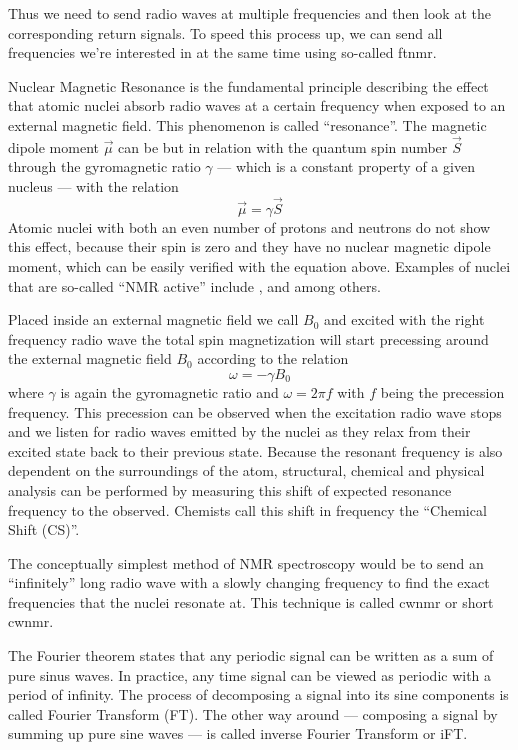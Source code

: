 Thus we need to send radio waves at multiple frequencies and then look at the corresponding return signals. To speed this process up, we can send all frequencies we're interested in at the same time using so-called \acrshort{ftnmr}.



Nuclear Magnetic Resonance is the fundamental principle describing the effect that atomic nuclei absorb radio waves at a certain frequency when exposed to an external magnetic field. This phenomenon is called \enquote{resonance}. The magnetic dipole moment \(\vec{\mu}\) can be but in relation with the quantum spin number \(\vec{S}\) through the gyromagnetic ratio \(\gamma\) --- which is a constant property of a given nucleus --- with the relation
\[
    \vec{\mu} = \gamma\vec{S}
\]
Atomic nuclei with both an even number of protons and neutrons do not show this effect, because their spin is zero and they have no nuclear magnetic dipole moment, which can be easily verified with the equation above. Examples of nuclei that are so-called \enquote{NMR active} include ,  and  among others.

Placed inside an external magnetic field we call \(B_0\) and excited with the right frequency radio wave the total spin magnetization will start precessing around the external magnetic field \(B_0\) according to the relation
\[
    \omega = -\gamma{}B_0
\]
where \(\gamma\) is again the gyromagnetic ratio and \(\omega = 2\pi{}f\) with \(f\) being the precession frequency. This precession can be observed when the excitation radio wave stops and we listen for radio waves emitted by the nuclei as they relax from their excited state back to their previous state. Because the resonant frequency is also dependent on the surroundings of the atom, structural, chemical and physical analysis can be performed by measuring this shift of expected resonance frequency to the observed. Chemists call this shift in frequency the \enquote{Chemical Shift (CS)}.

The conceptually simplest method of NMR spectroscopy would be to send an \enquote{infinitely} long radio wave with a slowly changing frequency to find the exact frequencies that the nuclei resonate at. This technique is called \acrlong{cwnmr} or short \acrshort{cwnmr}.

The Fourier theorem states that any periodic signal can be written as a sum of pure sinus waves. In practice, any time signal can be viewed as periodic with a period of infinity. The process of decomposing a signal into its sine components is called Fourier Transform (FT). The other way around --- composing a signal by summing up pure sine waves --- is called inverse Fourier Transform or iFT.

